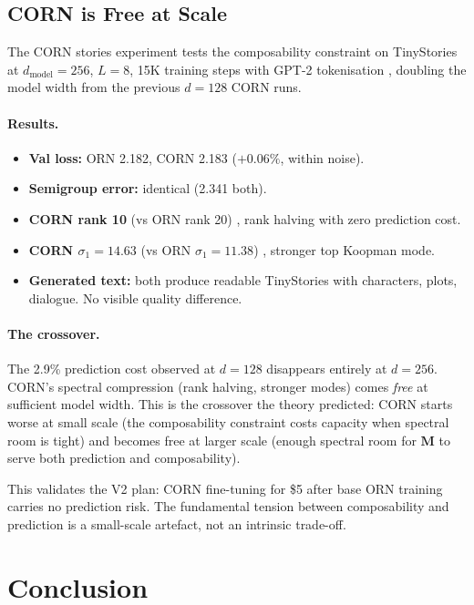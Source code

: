 \documentclass[11pt, a4paper]{article}
\newcommand{\M}{\mathbf{M}}
\theoremstyle{remark}
\begin{document}
\subsection{CORN is Free at Scale}

The CORN stories experiment tests the composability constraint on TinyStories at $d_{\mathrm{model}}=256$, $L=8$, 15K training steps with GPT-2 tokenisation ,  doubling the model width from the previous $d=128$ CORN runs.

\paragraph{Results.}
\begin{itemize}[nosep]
  \item \textbf{Val loss:} ORN 2.182, CORN 2.183 ($+0.06\%$, within noise).
  \item \textbf{Semigroup error:} identical (2.341 both).
  \item \textbf{CORN rank 10} (vs ORN rank 20) ,  rank halving with zero prediction cost.
  \item \textbf{CORN $\sigma_1 = 14.63$} (vs ORN $\sigma_1 = 11.38$) ,  stronger top Koopman mode.
  \item \textbf{Generated text:} both produce readable TinyStories with characters, plots, dialogue. No visible quality difference.
\end{itemize}

\paragraph{The crossover.}
The 2.9\% prediction cost observed at $d=128$ disappears entirely at $d=256$.
CORN's spectral compression (rank halving, stronger modes) comes \emph{free} at sufficient model width.
This is the crossover the theory predicted: CORN starts worse at small scale (the composability constraint costs capacity when spectral room is tight) and becomes free at larger scale (enough spectral room for $\M$ to serve both prediction and composability).

This validates the V2 plan: CORN fine-tuning for \$5 after base ORN training carries no prediction risk.
The fundamental tension between composability and prediction is a small-scale artefact, not an intrinsic trade-off.

\section{Conclusion}
\end{document}
